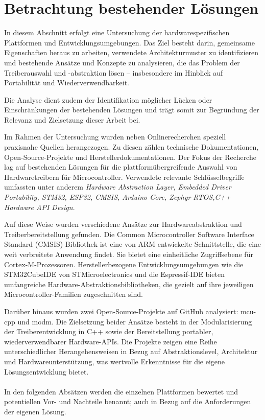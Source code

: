 \section{Betrachtung bestehender Lösungen}
In diesem Abschnitt erfolgt eine Untersuchung der hardwarespezifischen Plattformen und Entwicklungsumgebungen.
Das Ziel besteht darin, gemeinsame Eigenschaften heraus zu arbeiten, verwendete Architekturmuster zu identifizieren und bestehende Ansätze und Konzepte zu analysieren, die das Problem der Treiberauswahl und -abstraktion lösen – insbesondere im Hinblick auf Portabilität und Wiederverwendbarkeit. 

Die Analyse dient zudem der Identifikation möglicher Lücken oder Einschränkungen der bestehenden Lösungen und trägt somit zur Begründung der Relevanz und Zielsetzung dieser Arbeit bei.

Im Rahmen der Untersuchung wurden neben Onlinerecherchen speziell praxisnahe Quellen herangezogen. 
Zu diesen zählen technische Dokumentationen, Open-Source-Projekte und Herstellerdokumentationen.
Der Fokus der Recherche lag auf bestehenden Lösungen für die plattformübergreifende Auswahl von Hardwaretreibern für Microcontroller.
Verwendete relevante Schlüsselbegriffe umfassten unter anderem \textit{Hardware Abstraction Layer, Embedded Driver Portability, STM32, ESP32, CMSIS, Arduino Core, Zephyr RTOS,C++ Hardware API Design}.

Auf diese Weise wurden verschiedene Ansätze zur Hardwareabstraktion und Treiberbereitstellung gefunden.
Die Common Microcontroller Software Interface Standard (CMSIS)-Bibliothek ist eine von ARM entwickelte Schnittstelle, die eine weit verbreitete Anwendung findet. 
Sie bietet eine einheitliche Zugriffsebene für Cortex-M-Prozessoren. 
Herstellerbezogene Entwicklungsumgebungen wie die STM32CubeIDE von STMicroelectronics und die Espressif-IDE bieten umfangreiche Hardware-Abstraktionsbibliotheken, die gezielt auf ihre jeweiligen Microcontroller-Familien zugeschnitten sind.

Darüber hinaus wurden zwei Open-Source-Projekte auf GitHub analysiert: mcu-cpp\cite{github_mcu_cpp} und modm\cite{github_modm}. 
Die Zielsetzung beider Ansätze besteht in der Modularisierung der Treiberentwicklung in C++ sowie der Bereitstellung portabler, wiederverwendbarer Hardware-APIs. 
Die Projekte zeigen eine Reihe unterschiedlicher Herangehensweisen in Bezug auf Abstraktionslevel, Architektur und Hardwareunterstützung, was wertvolle Erkenntnisse für die eigene Lösungsentwicklung bietet.
\\
\\
In den folgenden Absätzen werden die einzelnen Plattformen bewertet und potentiellen Vor- und Nachteile benannt; auch in Bezug auf die Anforderungen der eigenen Lösung. 


